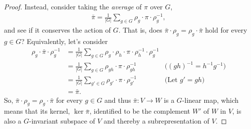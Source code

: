 \documentclass[12pt, a4paper, twoside]{article}
\theoremstyle{definition}
\theoremstyle{remark}
\numberwithin{equation}{section}
\newcommand{\1}{\mathbf{1}}
\newcommand{\0}{\mathbf{0}}
\newcommand{\wvec}{\mathbf{w}}
\newcommand{\barpi}{\bar{\pi}}
\begin{document}
\begin{proof}
		Instead, consider taking the \textit{average} of $\pi$ over $G$,
		\begin{align*}
			\barpi = \frac{1}{|G|} \sum_{g \in G} \rho_g \cdot \pi \cdot \rho_g^{-1},
		\end{align*}
		and see if it conserves the action of $G$. That is, does $\barpi\cdot \rho_g = \rho_g \cdot \barpi$ hold for every $g \in G$? Equivalently, let's consider
		\begin{align*}
			\rho_g \cdot \barpi \cdot \rho_g^{-1} &= \frac{1}{|G|} \sum_{g \in G} \rho_g \cdot \rho_h \cdot \pi \cdot \rho_h^{-1} \cdot \rho_g^{-1} \\
			&= \frac{1}{|G|} \sum_{g \in G} \rho_{gh} \cdot \pi \cdot \rho_{gh}^{-1} & \text{($(gh)^{-1}=h^{-1}g^{-1}$)}\\
			&= \frac{1}{|G|} \sum_{g' \in G} \rho_{g'} \cdot \pi \cdot \rho_{g'}^{-1} & \text{(Let $g' = gh$)} \\
			&= \barpi.
		\end{align*}
		So, $\barpi \cdot \rho_g = \rho_g \cdot \barpi$ for every $g \in G$ and thus $\barpi: V \rightarrow W$ is a $G$-linear map, which means that its kernel, $\ker \barpi$, identified to be the complement $W'$ of $W$ in $V$, is also a $G$-invariant subspace of $V$ and thereby a subrepresentation of $V$. 

\end{proof}
\end{document}
